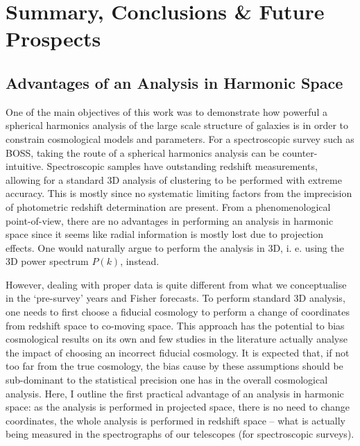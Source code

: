 %
\chapter{Summary, Conclusions \& Future Prospects}
\label{Chap:Conclusions}


\section{Advantages of an Analysis in Harmonic Space}
\label{sec:conclusion:Harmonic}
One of the main objectives of this work was to demonstrate how powerful a spherical harmonics analysis of the large scale structure of galaxies is in order to constrain cosmological models and parameters. For a spectroscopic survey such as BOSS, taking the route of a spherical harmonics analysis can be counter-intuitive. Spectroscopic samples have outstanding redshift measurements, allowing for a standard 3D analysis of clustering to be performed with extreme accuracy. This is mostly since no systematic limiting factors from the imprecision of photometric redshift determination are present. From a phenomenological point-of-view, there are no advantages in performing an analysis in harmonic space since it seems like radial information is mostly lost due to projection effects. One would naturally argue to perform the analysis in 3D, i. e. using the 3D power spectrum $P(k)$, instead. 

\qquad However, dealing with proper data is quite different from what we conceptualise in the `pre-survey' years and Fisher forecasts. To perform standard 3D analysis, one needs to first choose a fiducial cosmology to perform a change of coordinates from redshift space to co-moving space. This approach has the potential to bias cosmological results on its own and few studies in the literature actually analyse the impact of choosing an incorrect fiducial cosmology. It is expected that, if not too far from the true cosmology, the bias cause by these assumptions should be sub-dominant to the statistical precision one has in the overall cosmological analysis. Here, I outline the first practical advantage of an analysis in harmonic space: as the analysis is performed in projected space, there is no need to change coordinates, the whole analysis is performed in redshift space -- what is actually being measured in the spectrographs of our telescopes (for spectroscopic surveys).

